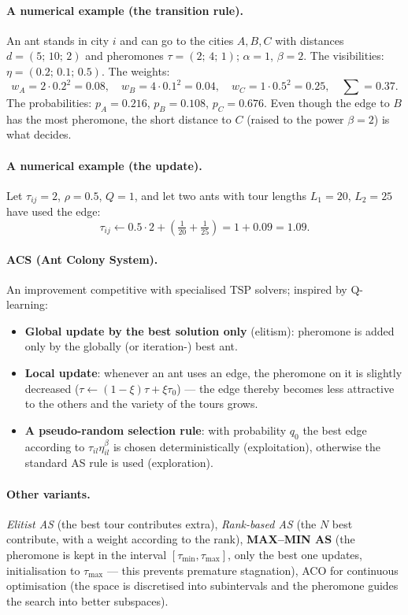 \documentclass[11pt,a4paper]{article}
\theoremstyle{definition}
\begin{document}
\paragraph{A numerical example (the transition rule).} An ant stands in city $i$
and can go to the cities $A, B, C$ with distances $d = (5;\,10;\,2)$ and
pheromones $\tau = (2;\,4;\,1)$; $\alpha = 1$, $\beta = 2$.
The visibilities: $\eta = (0.2;\,0.1;\,0.5)$. The weights:
\[
w_A = 2 \cdot 0.2^2 = 0.08,\quad
w_B = 4 \cdot 0.1^2 = 0.04,\quad
w_C = 1 \cdot 0.5^2 = 0.25,\quad \textstyle\sum = 0.37 .
\]
The probabilities: $p_A = 0.216$, $p_B = 0.108$, $p_C = 0.676$.
Even though the edge to $B$ has the most pheromone, the short distance to $C$
(raised to the power $\beta = 2$) is what decides.

\paragraph{A numerical example (the update).} Let $\tau_{ij} = 2$,
$\rho = 0.5$, $Q = 1$, and let two ants with tour lengths $L_1 = 20$,
$L_2 = 25$ have used the edge:
\[
\tau_{ij} \gets 0.5 \cdot 2 + \left(\tfrac{1}{20} + \tfrac{1}{25}\right)
= 1 + 0.09 = 1.09 .
\]

\paragraph{ACS (Ant Colony System).} An improvement competitive with specialised
TSP solvers; inspired by Q-learning:
\begin{itemize}
\item \textbf{Global update by the best solution only} (elitism): pheromone is
  added only by the globally (or iteration-) best ant.
\item \textbf{Local update}: whenever an ant uses an edge, the pheromone on it
  is slightly decreased ($\tau \gets (1-\xi)\tau + \xi\tau_0$) --- the edge
  thereby becomes less attractive to the others and the variety of the tours
  grows.
\item \textbf{A pseudo-random selection rule}: with probability $q_0$ the best
  edge according to $\tau_{il}\eta_{il}^{\beta}$ is chosen deterministically
  (exploitation), otherwise the standard AS rule is used (exploration).
\end{itemize}

\paragraph{Other variants.}
\emph{Elitist AS} (the best tour contributes extra),
\emph{Rank-based AS} (the $N$ best contribute, with a weight according to the
rank),
\textbf{MAX--MIN AS} (the pheromone is kept in the interval
$[\tau_{\min}, \tau_{\max}]$, only the best one updates, initialisation to
$\tau_{\max}$ --- this prevents premature stagnation),
ACO for continuous optimisation (the space is discretised into subintervals and
the pheromone guides the search into better subspaces).
\end{document}
